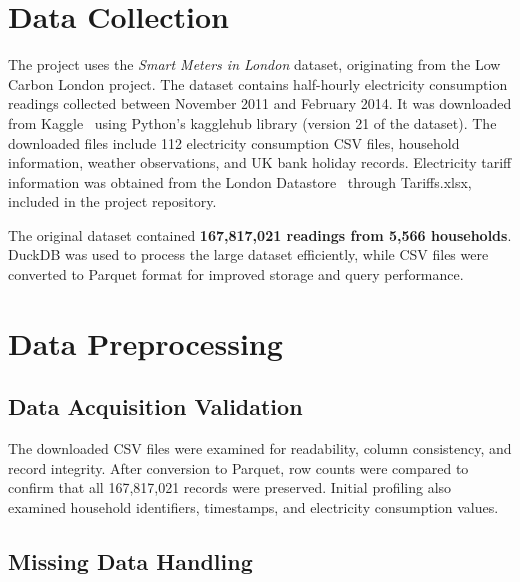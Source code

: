 \documentclass[11pt,letterpaper]{article}
\begin{document}
\maketitleblock

\section{Data Collection}
\label{sec:collection}

The project uses the \emph{Smart Meters in London} dataset, originating from
the Low Carbon London project. The dataset contains half-hourly
electricity consumption readings collected between November 2011 and
February 2014. It was downloaded from Kaggle~\cite{kaggle_smartmeters}
using Python's kagglehub library (version 21 of the dataset). The
downloaded files include 112 electricity consumption CSV files,
household information, weather observations, and UK bank holiday
records. Electricity tariff information was obtained from the London
Datastore~\cite{datastore_smartmeters} through Tariffs.xlsx, included in the project repository.

The original dataset contained \textbf{167,817,021 readings from 5,566
households}. DuckDB was used to process the large dataset efficiently,
while CSV files were converted to Parquet format for improved storage
and query performance.

\section{Data Preprocessing}
\label{sec:preprocessing}

\subsection{Data Acquisition Validation}
\label{sec:validation}

The downloaded CSV files were examined for readability, column
consistency, and record integrity. After conversion to Parquet, row
counts were compared to confirm that all 167,817,021 records were
preserved. Initial profiling also examined household identifiers,
timestamps, and electricity consumption values.

\subsection{Missing Data Handling}
\label{sec:missing}
\end{document}
